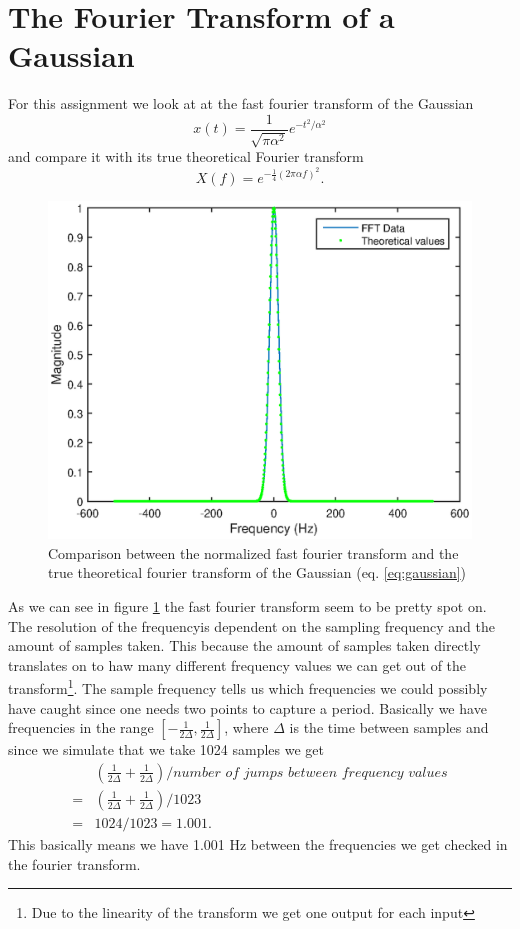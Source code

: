 \documentclass[11pt]{article}
\begin{document}
\section{The Fourier Transform of a Gaussian}
For this assignment we look at at the fast fourier transform of the Gaussian
\begin{equation}
	x(t) = \frac{1}{\sqrt{\pi \alpha^2}} e^{-t^2/\alpha^2}
	\label{eq:gaussian}
\end{equation}
and compare it with its true theoretical Fourier transform
\begin{equation}
	X(f) = e^{-\frac{1}{4} (2 \pi \alpha f)^2}.
	\label{eq:guassianFFT}
\end{equation}
\begin{figure}[H]
	\centering
	\includegraphics[width=1\textwidth]{../ex1/gaussianFFT}
	\caption{Comparison between the normalized fast fourier transform and the true theoretical fourier transform of the Gaussian (eq. \ref{eq:gaussian})}
	\label{fig:gaussianFFT}
\end{figure}

As we can see in figure \ref{fig:gaussianFFT} the fast fourier transform seem to be pretty spot on. The resolution of the frequencyis dependent on the sampling frequency and the amount of samples taken. This because the amount of samples taken directly translates on to haw many different frequency values we can get out of the transform\footnote{Due to the linearity of the transform we get one output for each input}. The sample frequency tells us which frequencies we could possibly have caught since one needs two points to capture a period. Basically we have frequencies in the range $[-\frac{1}{2 \Delta},\frac{1}{2 \Delta}]$, where $\Delta$ is the time between samples and since we simulate that we take 1024 samples we get 
\begin{align}
	&(\frac{1}{2 \Delta} +\frac{1}{2 \Delta})/\textit{number of jumps between frequency values} \\ 
	=& (\frac{1}{2\Delta} +\frac{1}{2\Delta})/1023\\
	=& 1024/1023 = 1.001.
\end{align}
This basically means we have 1.001 Hz between the frequencies we get checked in the fourier transform.
\end{document}
